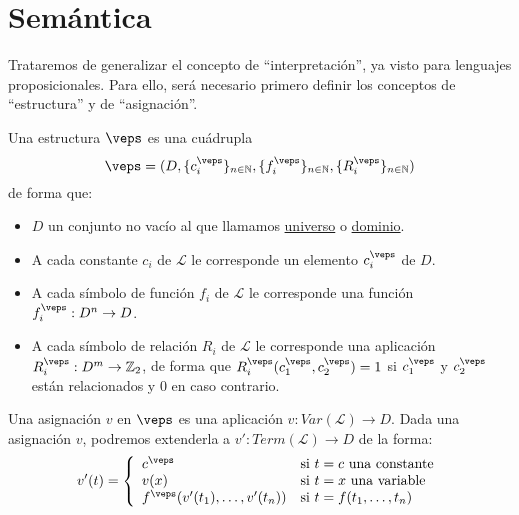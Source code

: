 \section{Semántica}
Trataremos de generalizar el concepto de ``interpretación'', ya visto para lenguajes proposicionales. Para ello, será necesario primero definir los conceptos de ``estructura'' y de ``asignación''.

\begin{definicion}[Estructura]
    Una estructura $\veps$ es una cuádrupla
    \begin{equation*}
        \veps = (D, \{c_i^\veps\}_{n\in \mathbb{N}}, \{f_i^\veps\}_{n\in \mathbb{N}}, \{R_i^\veps\}_{n\in \mathbb{N}})
    \end{equation*}
    de forma que:
    \begin{itemize}
        \item $D$ un conjunto no vacío al que llamamos \underline{universo} o \underline{dominio}.
        \item A cada constante $c_i$ de $\mathcal{L}$ le corresponde un elemento $c_i^{\veps}$ de $D$.
        \item A cada símbolo de función $f_i$ de $\mathcal{L}$ le corresponde una función $f_i^\veps:D^n\to D$.
        \item A cada símbolo de relación $R_i$ de $\mathcal{L}$ le corresponde una aplicación ${R_i^\veps:D^m\to\mathbb{Z}_2}$, de forma que $R_i^\veps(c_1^\veps,c_2^\veps)=1$ si $c_1^\veps$ y $c_2^\veps$ están relacionados y 0 en caso contrario.
    \end{itemize}
\end{definicion}

\begin{definicion}[Asignación]
    Una asignación $v$ en $\veps$ es una aplicación $v:Var(\mathcal{L})\to D$. Dada una asignación $v$, podremos extenderla a $v':Term(\mathcal{L})\to D$ de la forma:
    \begin{equation*}
        v'(t) = \left\{\begin{array}{ll}
                c^\veps & \text{si\ } t=c \text{\ una constante} \\
                v(x) & \text{si\ } t=x \text{\ una variable} \\
                f^\veps(v'(t_1),\ldots,v'(t_n)) &\text{si\ } t=f(t_1,\ldots,t_n)
        \end{array}\right.
    \end{equation*}
\end{definicion}

